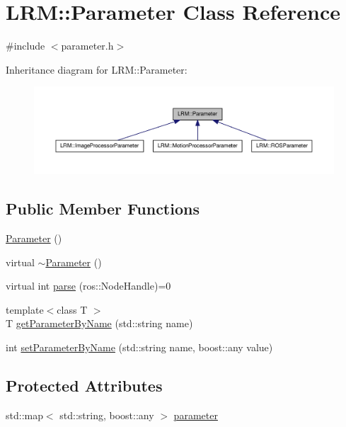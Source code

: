 \hypertarget{classLRM_1_1Parameter}{\section{\-L\-R\-M\-:\-:\-Parameter \-Class \-Reference}
\label{classLRM_1_1Parameter}
}


{\ttfamily \#include $<$parameter.\-h$>$}



\-Inheritance diagram for \-L\-R\-M\-:\-:\-Parameter\-:\nopagebreak
\begin{figure}[H]
\begin{center}
\leavevmode
\includegraphics[width=350pt]{classLRM_1_1Parameter__inherit__graph}
\end{center}
\end{figure}
\subsection*{\-Public \-Member \-Functions}
\begin{DoxyCompactItemize}
\item 
\hyperlink{classLRM_1_1Parameter_a1e33c84585b5d4979d4928d3400c7bd5}{\-Parameter} ()
\item 
virtual \hyperlink{classLRM_1_1Parameter_a48ef0a4ad52f8c998081fc7aaee8bcb0}{$\sim$\-Parameter} ()
\item 
virtual int \hyperlink{classLRM_1_1Parameter_ad53ef22f20e18578caa644866aaa234b}{parse} (ros\-::\-Node\-Handle)=0
\item 
{\footnotesize template$<$class T $>$ }\\\-T \hyperlink{classLRM_1_1Parameter_a1e39678803d61a1cfe74b9f2fcc2d847}{get\-Parameter\-By\-Name} (std\-::string name)
\item 
int \hyperlink{classLRM_1_1Parameter_a84b380711eed82a3b58dd9b5f3692f79}{set\-Parameter\-By\-Name} (std\-::string name, boost\-::any value)
\end{DoxyCompactItemize}
\subsection*{\-Protected \-Attributes}
\begin{DoxyCompactItemize}
\item 
std\-::map$<$ std\-::string, boost\-::any $>$ \hyperlink{classLRM_1_1Parameter_ac16ee52d4a330bb21b85a2a01e184da0}{parameter}
\end{DoxyCompactItemize}


